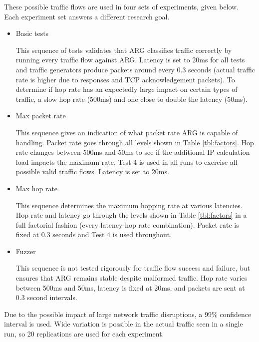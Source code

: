 
\par These possible traffic flows are used in four sets of experiments, given below. Each experiment set answers a different research goal.
\begin{itemize}
	\item Basic tests
	\par This sequence of tests validates that \ac{ARG} classifies traffic correctly by running every traffic flow against \ac{ARG}. Latency is set to 20ms for all tests and traffic generators produce packets around every 0.3 seconds (actual traffic rate is higher due to responses and \ac{TCP} acknowledgement packets). To determine if hop rate has an expectedly large impact on certain types of traffic, a slow hop rate (500ms) and one close to double the latency (50ms).

	\item Max packet rate
	\par This sequence gives an indication of what packet rate \ac{ARG} is capable of handling. Packet rate goes through all levels shown in Table \ref{tbl:factors}. Hop rate changes between 500ms and 50ms to see if the additional \ac{IP} calculation load impacts the maximum rate. Test 4  is used in all runs to exercise all possible valid traffic flows. Latency is set to 20ms.

	\item Max hop rate
	\par This sequence determines the maximum hopping rate at various latencies. Hop rate and latency go through the levels shown in Table \ref{tbl:factors} in a full factorial fashion (every latency-hop rate combination). Packet rate is fixed at 0.3 seconds and Test 4 is used throughout.

	\item Fuzzer
	\par This sequence is not tested rigorously for traffic flow success and failure, but ensures that \ac{ARG} remains stable despite malformed traffic. Hop rate varies between 500ms and 50ms, latency is fixed at 20ms, and packets are sent at 0.3 second intervals.
\end{itemize}

\par Due to the possible impact of large network traffic disruptions, a 99\% confidence interval is used. Wide variation is possible in the actual traffic seen in a single run, so 20 replications are used for each experiment.

